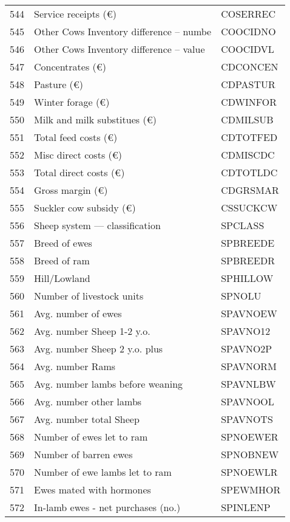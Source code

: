 \documentclass{article}\usepackage{graphicx, color}
\begin{document}
\begin{flushleft}
\begin{table}[ht]
\begin{center}
\begin{tabular}{rll}
  544 & Service receipts  (€) & COSERREC \\ 
  545 & Other Cows Inventory difference -- numbe & COOCIDNO \\ 
  546 & Other Cows Inventory difference -- value & COOCIDVL \\ 
  547 & Concentrates                 (€) & CDCONCEN \\ 
  548 & Pasture                      (€) & CDPASTUR \\ 
  549 & Winter forage                (€) & CDWINFOR \\ 
  550 & Milk and milk substitues     (€) & CDMILSUB \\ 
  551 & Total feed costs             (€) & CDTOTFED \\ 
  552 & Misc direct costs            (€) & CDMISCDC \\ 
  553 & Total direct costs           (€) & CDTOTLDC \\ 
  554 & Gross margin                 (€) & CDGRSMAR \\ 
  555 & Suckler cow subsidy    (€) & CSSUCKCW \\ 
  556 & Sheep system --- classification & SPCLASS \\ 
  557 & Breed of ewes & SPBREEDE \\ 
  558 & Breed of ram & SPBREEDR \\ 
  559 & Hill/Lowland & SPHILLOW \\ 
  560 & Number of livestock units & SPNOLU \\ 
  561 & Avg. number of ewes & SPAVNOEW \\ 
  562 & Avg. number Sheep 1-2 y.o. & SPAVNO12 \\ 
  563 & Avg. number Sheep 2 y.o. plus & SPAVNO2P \\ 
  564 & Avg. number Rams & SPAVNORM \\ 
  565 & Avg. number lambs before weaning & SPAVNLBW \\ 
  566 & Avg. number other lambs & SPAVNOOL \\ 
  567 & Avg. number total Sheep & SPAVNOTS \\ 
  568 & Number of ewes let to ram & SPNOEWER \\ 
  569 & Number of barren ewes & SPNOBNEW \\ 
  570 & Number of ewe lambs let to ram & SPNOEWLR \\ 
  571 & Ewes mated with hormones & SPEWMHOR \\ 
  572 & In-lamb ewes - net purchases  (no.) & SPINLENP \\ 

\end{tabular}
\end{center}
\end{table}
\end{flushleft}
\end{document}
